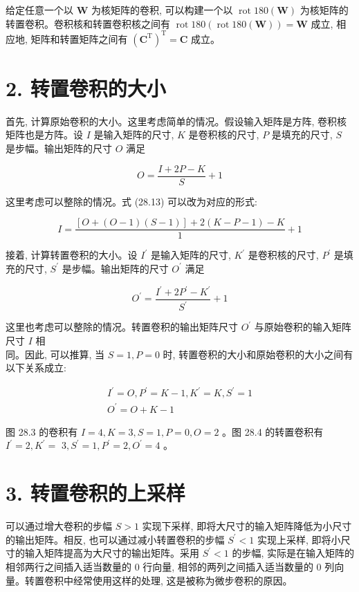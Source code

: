 \documentclass[10pt]{article}
\begin{document}
给定任意一个以 $\boldsymbol{W}$ 为核矩阵的卷积, 可以构建一个以 $\operatorname{rot} 180(\boldsymbol{W})$ 为核矩阵的转置卷积。卷积核和转置卷积核之间有 $\operatorname{rot} 180(\operatorname{rot} 180(\boldsymbol{W}))=\boldsymbol{W}$ 成立, 相应地, 矩阵和转置矩阵之间有 $\left(\boldsymbol{C}^{\mathrm{T}}\right)^{\mathrm{T}}=\boldsymbol{C}$ 成立。

\section*{2. 转置卷积的大小}
首先, 计算原始卷积的大小。这里考虑简单的情况。假设输入矩阵是方阵, 卷积核矩阵也是方阵。设 $I$ 是输入矩阵的尺寸, $K$ 是卷积核的尺寸, $P$ 是填充的尺寸, $S$ 是步幅。输出矩阵的尺寸 $O$ 满足


\begin{equation*}
O=\frac{I+2 P-K}{S}+1 \tag{28.13}
\end{equation*}


这里考虑可以整除的情况。式 (28.13) 可以改为对应的形式:

$$
I=\frac{[O+(O-1)(S-1)]+2(K-P-1)-K}{1}+1
$$

接着, 计算转置卷积的大小。设 $I^{\prime}$ 是输入矩阵的尺寸, $K^{\prime}$ 是卷积核的尺寸, $P^{\prime}$ 是填充的尺寸, $S^{\prime}$ 是步幅。输出矩阵的尺寸 $O^{\prime}$ 满足


\begin{equation*}
O^{\prime}=\frac{I^{\prime}+2 P^{\prime}-K^{\prime}}{S^{\prime}}+1 \tag{28.14}
\end{equation*}


这里也考虑可以整除的情况。转置卷积的输出矩阵尺寸 $O^{\prime}$ 与原始卷积的输入矩阵尺寸 $I$ 相\\
同。因此, 可以推算, 当 $S=1, P=0$ 时, 转置卷积的大小和原始卷积的大小之间有以下关系成立:

$$
\begin{gathered}
I^{\prime}=O, P^{\prime}=K-1, K^{\prime}=K, S^{\prime}=1 \\
O^{\prime}=O+K-1
\end{gathered}
$$

图 28.3 的卷积有 $I=4, K=3, S=1, P=0, O=2$ 。图 28.4 的转置卷积有 $I^{\prime}=2, K^{\prime}=$ $3, S^{\prime}=1, P^{\prime}=2, O^{\prime}=4$ 。

\section*{3. 转置卷积的上采样}
可以通过增大卷积的步幅 $S>1$ 实现下采样, 即将大尺寸的输入矩阵降低为小尺寸的输出矩阵。相反, 也可以通过减小转置卷积的步幅 $S^{\prime}<1$ 实现上采样, 即将小尺寸的输入矩阵提高为大尺寸的输出矩阵。采用 $S^{\prime}<1$ 的步幅, 实际是在输入矩阵的相邻两行之间插入适当数量的 0 行向量, 相邻的两列之间插入适当数量的 0 列向量。转置卷积中经常使用这样的处理, 这是被称为微步卷积的原因。
\end{document}
